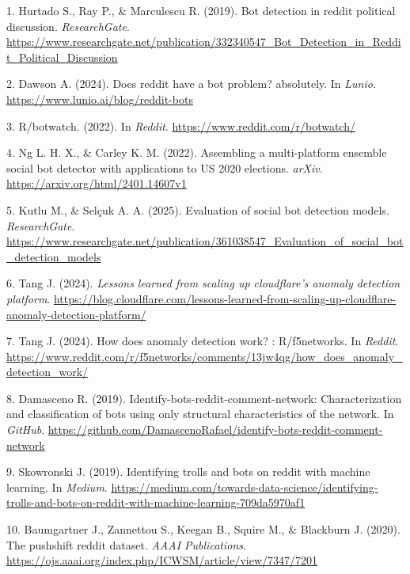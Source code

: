 \documentclass[
  12pt,
  letterpaper,
  DIV=11,
  numbers=noendperiod]{scrartcl}
\newlength{\cslhangindent}
\newenvironment{CSLReferences}[2] %
 {\begin{list}{}{%
  \setlength{\itemindent}{0pt}
  \setlength{\leftmargin}{0pt}
  \setlength{\parsep}{0pt}
  \ifodd #1
   \setlength{\leftmargin}{\cslhangindent}
   \setlength{\itemindent}{-1\cslhangindent}
  \fi
  \setlength{\itemsep}{#2\baselineskip}}}
 {\end{list}}
\begin{document}
\label{refs}
\begin{CSLReferences}{1}{0}
1. Hurtado S., Ray P., \& Marculescu R. (2019). Bot detection in reddit
political discussion. \emph{ResearchGate}.
\url{https://www.researchgate.net/publication/332340547_Bot_Detection_in_Reddit_Political_Discussion}

2. Dawson A. (2024). Does reddit have a bot problem? absolutely. In
\emph{Lunio}. \url{https://www.lunio.ai/blog/reddit-bots}

3. R/botwatch. (2022). In \emph{Reddit}.
\url{https://www.reddit.com/r/botwatch/}

4. Ng L. H. X., \& Carley K. M. (2022). Assembling a multi-platform
ensemble social bot detector with applications to US 2020 elections.
\emph{arXiv}. \url{https://arxiv.org/html/2401.14607v1}

5. Kutlu M., \& Selçuk A. A. (2025). Evaluation of social bot detection
models. \emph{ResearchGate}.
\url{https://www.researchgate.net/publication/361038547_Evaluation_of_social_bot_detection_models}

6. Tang J. (2024). \emph{Lessons learned from scaling up cloudflare's
anomaly detection platform}.
\url{https://blog.cloudflare.com/lessons-learned-from-scaling-up-cloudflare-anomaly-detection-platform/}

7. Tang J. (2024). How does anomaly detection work? : R/f5networks. In
\emph{Reddit}.
\url{https://www.reddit.com/r/f5networks/comments/13jw4qg/how_does_anomaly_detection_work/}

8. Damasceno R. (2019). Identify-bots-reddit-comment-network:
Characterization and classification of bots using only structural
characteristics of the network. In \emph{GitHub}.
\url{https://github.com/DamascenoRafael/identify-bots-reddit-comment-network}

9. Skowronski J. (2019). Identifying trolls and bots on reddit with
machine learning. In \emph{Medium}.
\url{https://medium.com/towards-data-science/identifying-trolls-and-bots-on-reddit-with-machine-learning-709da5970af1}

10. Baumgartner J., Zannettou S., Keegan B., Squire M., \& Blackburn J.
(2020). The pushshift reddit dataset. \emph{AAAI Publications}.
\url{https://ojs.aaai.org/index.php/ICWSM/article/view/7347/7201}


\end{CSLReferences}
\end{document}
